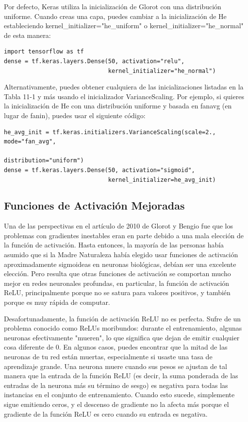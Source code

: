 \documentclass[11pt]{article}
\begin{document}
Por defecto, Keras utiliza la inicialización de Glorot con una
distribución uniforme. Cuando creas una capa, puedes cambiar a la
inicialización de He estableciendo kernel\_initializer="he\_uniform" o
kernel\_initializer="he\_normal" de esta manera:
\begin{verbatim}
import tensorflow as tf
dense = tf.keras.layers.Dense(50, activation="relu",
                              kernel_initializer="he_normal")
\end{verbatim}

Alternativamente, puedes obtener cualquiera de las inicializaciones
listadas en la Tabla 11-1 y más usando el inicializador
VarianceScaling. Por ejemplo, si quieres la inicialización de He con
una distribución uniforme y basada en fanavg (en lugar de fanin),
puedes usar el siguiente código:

\begin{verbatim}
he_avg_init = tf.keras.initializers.VarianceScaling(scale=2., mode="fan_avg",
                                                    distribution="uniform")
dense = tf.keras.layers.Dense(50, activation="sigmoid",
                              kernel_initializer=he_avg_init)
\end{verbatim}

\subsection{Funciones de Activación Mejoradas}
\label{sec:orgb3941da}
Una de las perspectivas en el artículo de 2010 de Glorot y Bengio fue
que los problemas con gradientes inestables eran en parte debido a una
mala elección de la función de activación. Hasta entonces, la mayoría
de las personas había asumido que si la Madre Naturaleza había elegido
usar funciones de activación aproximadamente sigmoideas en neuronas
biológicas, debían ser una excelente elección. Pero resulta que otras
funciones de activación se comportan mucho mejor en redes neuronales
profundas, en particular, la función de activación ReLU,
principalmente porque no se satura para valores positivos, y también
porque es muy rápida de computar.

Desafortunadamente, la función de activación ReLU no es
perfecta. Sufre de un problema conocido como ReLUs moribundos: durante
el entrenamiento, algunas neuronas efectivamente "mueren", lo que
significa que dejan de emitir cualquier cosa diferente de 0. En
algunos casos, puedes encontrar que la mitad de las neuronas de tu red
están muertas, especialmente si usaste una tasa de aprendizaje
grande. Una neurona muere cuando sus pesos se ajustan de tal manera
que la entrada de la función ReLU (es decir, la suma ponderada de las
entradas de la neurona más su término de sesgo) es negativa para todas
las instancias en el conjunto de entrenamiento. Cuando esto sucede,
simplemente sigue emitiendo ceros, y el descenso de gradiente no la
afecta más porque el gradiente de la función ReLU es cero cuando su
entrada es negativa.
\end{document}
